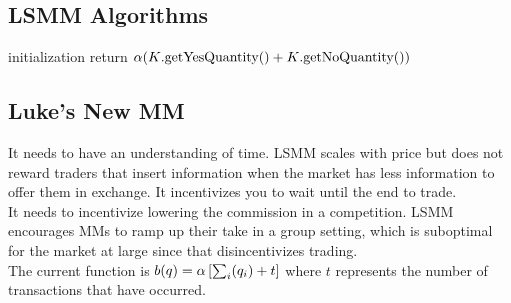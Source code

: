 \subsection{LSMM Algorithms}
\begin{algorithm}[H]
\SetAlgoLined
{}
initialization\;
return $\alpha (K\text{.getYesQuantity()} + K\text{.getNoQuantity()})$\;
\end{algorithm}

\subsection{Luke's New MM}

It needs to have an understanding of time. LSMM scales with price but does not reward traders that insert information when the market has less information to offer them in exchange. It incentivizes you to wait until the
end to trade. \\

It needs to incentivize lowering the commission in a competition. LSMM 
encourages MMs to ramp up their take in a group setting, which is
suboptimal for the market at large since that disincentivizes trading. \\

The current function is $b(q) = \alpha \left[\sum_{i}(q_i) + t \right]$ where $t$ represents the number of transactions that have occurred.
